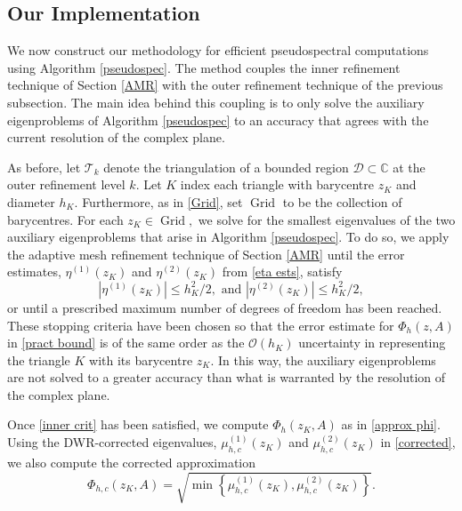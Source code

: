 \subsection{Our Implementation}

We now construct our methodology for efficient pseudospectral computations using Algorithm \ref{pseudospec}. The method couples the inner refinement technique of Section \ref{AMR} with the outer refinement technique of the previous subsection. The main idea behind this coupling is to only solve the auxiliary eigenproblems of Algorithm \ref{pseudospec} to an accuracy that agrees with the current resolution of the complex plane.

As before, let $\mathcal{T}_k$ denote the triangulation of a bounded region $\mathcal{D} \subset \mathbb{C}$ at the outer refinement level $k.$ Let $K$ index each triangle with barycentre $z_K$ and diameter $h_K.$ Furthermore, as in \eqref{Grid}, set $\operatorname{Grid}$ to be the collection of barycentres.
For each $z_K \in \operatorname{Grid},$ we solve for the smallest eigenvalues of the two auxiliary eigenproblems that arise in Algorithm \ref{pseudospec}. To do so, we apply the adaptive mesh refinement technique of Section \ref{AMR} until the error estimates, $\eta^{(1)}(z_K)$ and $\eta^{(2)}(z_K)$ from \eqref{eta ests}, satisfy
\begin{equation} \label{inner crit}
    |\eta^{(1)}(z_K)| \le h_K^2/2, \text{ and } |\eta^{(2)}(z_K)| \le h_K^2/2,
\end{equation}
or until a prescribed maximum number of degrees of freedom has been reached. These stopping criteria have been chosen so that the error estimate for $\Phi_h(z, A)$ in \eqref{pract bound} is of the same order as the $\mathcal{O}(h_K)$ uncertainty in representing the triangle $K$ with its barycentre $z_K.$
In this way, the auxiliary eigenproblems are not solved to a greater accuracy than what is warranted by the resolution of the complex plane. 


Once \eqref{inner crit} has been satisfied, we compute $\Phi_h(z_K, A)$ as in \eqref{approx phi}. Using the DWR-corrected eigenvalues, $\mu_{h,c}^{(1)}(z_K)$ and $\mu_{h,c}^{(2)}(z_K)$ in \eqref{corrected}, we also compute the corrected approximation
\begin{equation} \label{phi corr}
    \Phi_{h,c}(z_K, A) = \sqrt{ \min \left\{ \mu_{h,c}^{(1)}(z_K), \mu_{h,c}^{(2)}(z_K) \right\}   }.
\end{equation}

